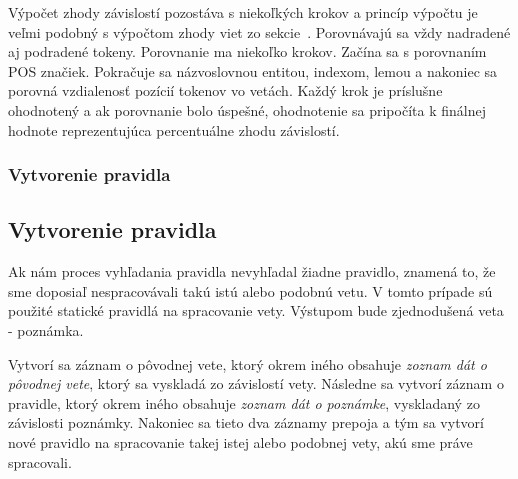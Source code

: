 Výpočet zhody závislostí pozostáva s niekoľkých krokov a princíp výpočtu je veľmi podobný s výpočtom zhody viet zo sekcie~. Porovnávajú sa vždy nadradené aj podradené tokeny. Porovnanie ma niekoľko krokov. Začína sa s porovnaním POS značiek. Pokračuje sa názvoslovnou entitou, indexom, lemou a nakoniec sa porovná vzdialenosť pozícií tokenov vo vetách. Každý krok je príslušne ohodnotený a ak porovnanie bolo úspešné, ohodnotenie sa pripočíta k finálnej hodnote reprezentujúca percentuálne zhodu závislostí.

%
%
{
	\subsubsection{Vytvorenie pravidla}
}
{
	\subsection{Vytvorenie pravidla}
}
\label{subsubsection:rule_creation}
Ak nám proces vyhľadania pravidla nevyhľadal žiadne pravidlo, znamená to, že sme doposiaľ nespracovávali takú istú alebo podobnú vetu. V tomto prípade sú použité statické pravidlá na spracovanie vety. Výstupom bude zjednodušená veta - poznámka.

Vytvorí sa záznam o pôvodnej vete, ktorý okrem iného obsahuje \textit{zoznam dát o pôvodnej vete}, ktorý sa vyskladá zo závislostí vety. Následne sa vytvorí záznam o pravidle, ktorý okrem iného obsahuje \textit{zoznam dát o poznámke}, vyskladaný zo závislosti poznámky. Nakoniec sa tieto dva záznamy prepoja a tým sa vytvorí nové pravidlo na spracovanie takej istej alebo podobnej vety, akú sme práve spracovali.



